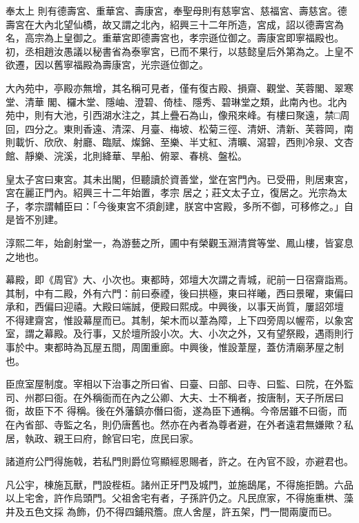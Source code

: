 \begin{pinyinscope}
 奉太上
 則有德壽宮、重華宮、壽康宮，奉聖母則有慈寧宮、慈福宮、壽慈宮。德壽宮在大內北望仙橋，故又謂之北內，紹興三十二年所造，宮成，詔以德壽宮為名，高宗為上皇御之。重華宮即德壽宮也，孝宗遜位御之。壽康宮即寧福殿也。初，丞相趙汝愚議以秘書省為泰寧宮，已而不果行，以慈懿皇后外第為之。上皇不欲遷，因以舊寧福殿為壽康宮，光宗遜位御之。



 大內苑中，亭殿亦無增，其名稱可見者，僅有復古殿、損齋、觀堂、芙蓉閣、翠寒堂、清華
 閣、欏木堂、隱岫、澄碧、倚桂、隱秀、碧琳堂之類，此南內也。北內苑中，則有大池，引西湖水注之，其上疊石為山，像飛來峰。有樓曰聚遠，禁□周回，四分之。東則香遠、清深、月臺、梅坡、松菊三徑、清妍、清新、芙蓉岡，南則載忻、欣欣、射廳、臨賦、燦錦、至樂、半丈紅、清曠、瀉碧，西則冷泉、文杏館、靜樂、浣溪，北則絳華、旱船、俯翠、春桃、盤松。



 皇太子宮曰東宮。其未出閣，但聽讀於資善堂，堂在宮門內。已受冊，則居東宮，宮在麗正門內。紹興三十二年始置，孝宗
 居之；莊文太子立，復居之。光宗為太子，孝宗謂輔臣曰：「今後東宮不須創建，朕宮中宮殿，多所不御，可移修之。」自是皆不別建。



 淳熙二年，始創射堂一，為游藝之所，圃中有榮觀玉淵清賞等堂、鳳山樓，皆宴息之地也。



 幕殿，即《周官》大、小次也。東都時，郊壇大次謂之青城，祀前一日宿齋詣焉。其制，中有二殿，外有六門：前曰泰禋，後曰拱極，東曰祥曦，西曰景曜，東偏曰承和，西偏曰迎禧。大殿曰端誠，便殿曰熙成。中興後，以事天尚質，屢詔郊壇
 不得建齋宮，惟設幕屋而已。其制，架木而以葦為障，上下四旁周以幄帟，以象宮室，謂之幕殿。及行事，又於壇所設小次。大、小次之外，又有望祭殿，遇雨則行事於中。東都時為瓦屋五間，周圍重廊。中興後，惟設葦屋，蓋仿清廟茅屋之制也。



 臣庶室屋制度。宰相以下治事之所曰省、曰臺、曰部、曰寺、曰監、曰院，在外監司、州郡曰衙。在外稱衙而在內之公卿、大夫、士不稱者，按唐制，天子所居曰衙，故臣下不
 得稱。後在外藩鎮亦僭曰衙，遂為臣下通稱。今帝居雖不曰衙，而在內省部、寺監之名，則仍唐舊也。然亦在內者為尊者避，在外者遠君無嫌歟？私居，執政、親王曰府，餘官曰宅，庶民曰家。



 諸道府公門得施戟，若私門則爵位穹顯經恩賜者，許之。在內官不設，亦避君也。



 凡公宇，棟施瓦獸，門設梐枑。諸州正牙門及城門，並施鴟尾，不得施拒鵲。六品以上宅舍，許作烏頭門。父祖舍宅有者，子孫許仍之。凡民庶家，不得施重栱、藻井及五色文採
 為飾，仍不得四鋪飛簷。庶人舍屋，許五架，門一間兩廈而已。



\end{pinyinscope}